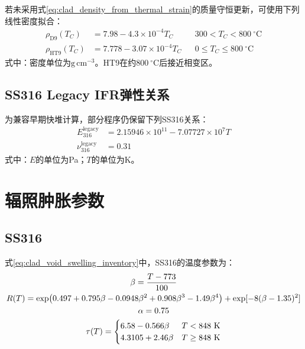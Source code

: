 若未采用式\eqref{eq:clad_density_from_thermal_strain}的质量守恒更新，可使用下列线性密度拟合：
\begin{equation}
	\label{eq:appendix_cladding_density_fits}
	\begin{aligned}
		\rho_{\mathrm{D9}}(T_C)
		&=7.98-4.3\times10^{-4}T_C
		&&300<T_C<800\ ^\circ\mathrm C\\
		\rho_{\mathrm{HT9}}(T_C)
		&=7.778-3.07\times10^{-4}T_C
		&&0\leq T_C\leq800\ ^\circ\mathrm C
	\end{aligned}
\end{equation}
\noindent 式中：密度单位为$\mathrm{g\,cm^{-3}}$。HT9在约$800\ ^\circ\mathrm C$后接近相变区。

\subsection{SS316 Legacy IFR弹性关系}

为兼容早期快堆计算，部分程序仍保留下列SS316关系：
\begin{equation}
	\label{eq:appendix_ss316_legacy_elasticity}
	\begin{aligned}
		E_{316}^{\mathrm{legacy}}
		&=2.15946\times10^{11}-7.07727\times10^7T\\
		\nu_{316}^{\mathrm{legacy}}&=0.31
	\end{aligned}
\end{equation}
\noindent 式中：$E$的单位为Pa；$T$的单位为K。

\section{辐照肿胀参数}
\label{app:cladding_swelling_parameters}

\subsection{SS316}

式\eqref{eq:clad_void_swelling_inventory}中，SS316的温度参数为\cite{halesBISONTheoryManual2016,hofmanMetallicFuelsHandbook2019}：
\begin{gather}
	\beta=\frac{T-773}{100}
	\notag
	\\
	R(T)=\exp\!\left(
	0.497+0.795\beta-0.0948\beta^2
	+0.908\beta^3-1.49\beta^4
	\right)
	+\exp[-8(\beta-1.35)^2]
	\notag
	\\
	\alpha=0.75
	\notag
	\\
	\tau(T)=
	\begin{cases}
		6.58-0.566\beta & T<848\ \mathrm{K}\\
		4.3105+2.46\beta & T\geq848\ \mathrm{K}
	\end{cases}
	\label{eq:appendix_ss316_swelling_parameters}
\end{gather}

